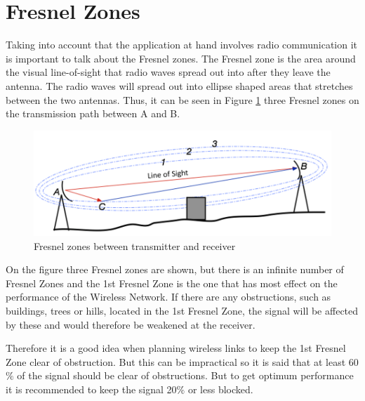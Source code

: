 \section{Fresnel Zones}\label{sec:fresnel}
Taking into account that the application at hand involves radio communication it is important to talk about the Fresnel zones. The Fresnel zone is the area around the visual line-of-sight that radio waves spread out into after they leave the antenna. The radio waves will spread out into ellipse shaped areas that stretches between the two antennas. Thus, it can be seen in Figure \ref{fig:fresnel_zones} three Fresnel zones on the transmission path between A and B. 

\begin{figure}[H]
	\centering
	\includegraphics[scale=0.65]{figures/fresnel_zones.png}
	\caption{Fresnel zones between transmitter and receiver}
	\label{fig:fresnel_zones}
\end{figure}

On the figure three Fresnel zones are shown, but there is an infinite number of Fresnel Zones and the 1st Fresnel Zone is the one that has most effect on the performance of the Wireless Network. If there are any obstructions, such as buildings, trees or hills, located in the 1st Fresnel Zone, the signal will be affected by these and would therefore be weakened at the receiver.

Therefore it is a good idea when planning wireless links to keep the 1st Fresnel Zone clear of obstruction. But this can be impractical so it is said that at least 60 $\%$ of the signal should be clear of obstructions. But to get optimum performance it is recommended to keep the signal 20$\%$ or less blocked. \\
%
%
%
%

